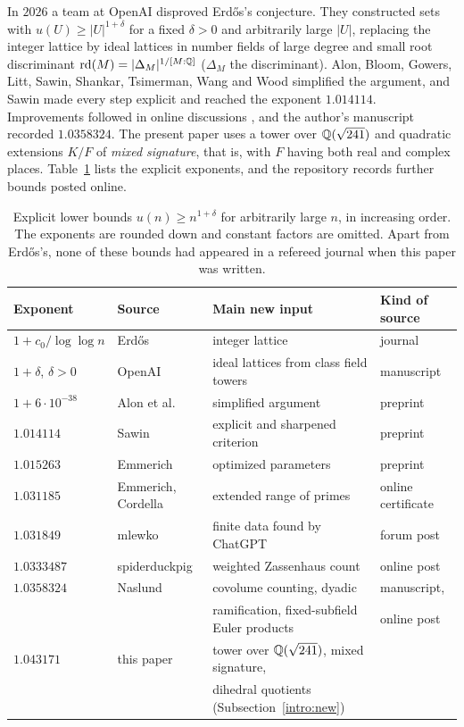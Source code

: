 In $2026$ a team at OpenAI \cite{OpenAI2026} disproved Erd\H{o}s's
conjecture. They constructed sets with $u(U)\ge|U|^{1+\delta}$ for a
fixed $\delta>0$ and arbitrarily large $|U|$, replacing the integer
lattice by ideal lattices in number fields of large degree and small
root discriminant $\operatorname{rd}(M)=|\Delta_M|^{1/[M:\mathbb Q]}$ ($\Delta_M$ the
discriminant). Alon, Bloom, Gowers, Litt, Sawin, Shankar, Tsimerman,
Wang and Wood \cite{Alon2026} simplified the argument, and Sawin
\cite{Sawin2026} made every step explicit and reached the exponent
$1.014114$. Improvements followed in online discussions
\cite{ErdosProblems90,SpiderduckpigMO2026,NaslundMO2026}, and the
author's manuscript \cite{Naslund0358} recorded $1.0358324$. The present
paper uses a tower over $\mathbb Q(\sqrt{241})$ and quadratic extensions $K/F$
of \emph{mixed signature}, that is, with $F$ having both real and complex
places. Table~\ref{intro:table-bounds} lists the explicit exponents, and the
repository \cite{TaoConstants84a} records further bounds posted online.

\begin{table}[htbp]
\centering
\caption{Explicit lower bounds $u(n)\ge n^{1+\delta}$ for arbitrarily
large $n$, in increasing order. The exponents are rounded down and
constant factors are omitted. Apart from Erd\H{o}s's, none of these
bounds had appeared in a refereed journal when this paper was written.}
\label{intro:table-bounds}
\small
\begin{tabular}{@{}llll@{}}
\toprule
Exponent & Source & Main new input & Kind of source\\
\midrule
$1+c_0/\log\log n$ & Erd\H{o}s \cite{Erdos1946} & integer lattice & journal\\
$1+\delta$, $\delta>0$ & OpenAI \cite{OpenAI2026} & ideal lattices from class field towers & manuscript\\
$1+6\cdot10^{-38}$ & Alon et al.\ \cite{Alon2026} & simplified argument & preprint\\
$1.014114$ & Sawin \cite{Sawin2026} & explicit and sharpened criterion & preprint\\
$1.015263$ & Emmerich \cite{Emmerich2026} & optimized parameters & preprint\\
$1.031185$ & Emmerich, Cordella \cite{EmmerichCordella2026} & extended range of primes & online certificate\\
$1.031849$ & mlewko \cite{ErdosProblems90} & finite data found by ChatGPT & forum post\\
$1.0333487$ & spiderduckpig \cite{SpiderduckpigMO2026} & weighted Zassenhaus count & online post\\
$1.0358324$ & Naslund \cite{Naslund0358,NaslundMO2026} & covolume counting, dyadic & manuscript,\\
 & & ramification, fixed-subfield Euler products & online post\\
$1.043171$ & this paper & tower over $\mathbb Q(\sqrt{241})$, mixed signature, & \\
 & & dihedral quotients (Subsection~\ref{intro:new}) & \\
\bottomrule
\end{tabular}
\end{table}

